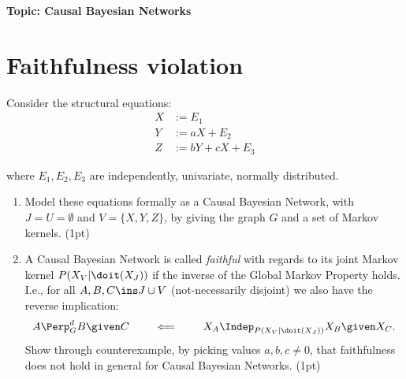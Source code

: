 
\flushleft\textbf{Topic: Causal Bayesian Networks}
\section{Faithfulness violation}
Consider the structural equations:
\begin{align*}
  X &:= E_1\\
  Y &:= aX + E_2 \\
  Z &:= bY + cX + E_3
\end{align*}

where $E_1, E_2, E_3$ are independently, univariate, normally distributed.
\begin{enumerate}
  \item Model these equations formally as a Causal Bayesian Network, with $J = U = \emptyset$ and $V = \{X,Y,Z\}$, by giving the graph $G$ and a set of Markov kernels. (1pt)
  \item A Causal Bayesian Network is called \emph{faithful} with regards to its joint Markov kernel $P(X_V|\doit(X_J))$ if the inverse of the Global Markov Property holds. I.e., for all $A, B, C \ins J \cup V$ (not-necessarily disjoint) we also have the reverse implication:
  \[ A \Perp^d_G B \given C \qquad \impliedby \qquad X_A \Indep_{P(X_V|\doit(X_J))} X_B \given X_C. \]
  Show through counterexample, by picking values $a, b, c \neq 0$, that faithfulness does not hold in general for Causal Bayesian Networks. (1pt)
\end{enumerate}


